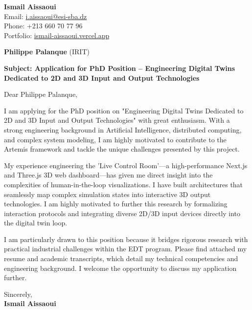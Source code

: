 \documentclass[11pt,a4paper]{article}
\begin{document}
\thispagestyle{empty}

\begin{flushright}
\textbf{Ismail Aissaoui} \\
Email: \href{mailto:i.aissaoui@esi-sba.dz}{i.aissaoui@esi-sba.dz} \\
Phone: +213 660 70 77 96 \\
Portfolio: \href{https://ismail-aissaoui.vercel.app}{ismail-aissaoui.vercel.app}
\end{flushright}

\vspace{1em}

\begin{flushleft}
\textbf{Philippe Palanque} (IRIT)
\end{flushleft}

\vspace{1em}
\noindent\textbf{Subject: Application for PhD Position -- Engineering Digital Twins Dedicated to 2D and 3D Input and Output Technologies}
\vspace{1em}

\noindent Dear Philippe Palanque,

\vspace{1em}
\noindent
I am applying for the PhD position on "Engineering Digital Twins Dedicated to 2D and 3D Input and Output Technologies" with great enthusiasm. With a strong engineering background in Artificial Intelligence, distributed computing, and complex system modeling, I am highly motivated to contribute to the Artemis framework and tackle the unique challenges presented by this project.

\vspace{0.5em}
\noindent
My experience engineering the 'Live Control Room'---a high-performance Next.js and Three.js 3D web dashboard---has given me direct insight into the complexities of human-in-the-loop visualizations. I have built architectures that seamlessly map complex simulation states into interactive 3D output technologies. I am highly motivated to further this research by formalizing interaction protocols and integrating diverse 2D/3D input devices directly into the digital twin loop.

\vspace{0.5em}
\noindent
I am particularly drawn to this position because it bridges rigorous research with practical industrial challenges within the EDT program. Please find attached my resume and academic transcripts, which detail my technical competencies and engineering background. I welcome the opportunity to discuss my application further.

\vspace{1.5em}
\noindent
Sincerely, \\[0.5em]
\textbf{Ismail Aissaoui}
\end{document}
